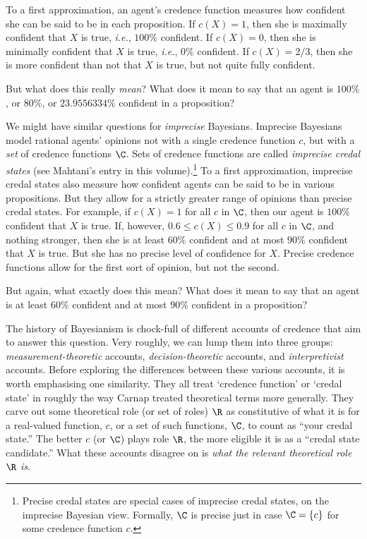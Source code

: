 To a first approximation, an agent's credence function measures how confident she can be said to be in each proposition. If $c(X)=1$, then she is maximally confident that $X$ is true, \textit{i.e.}, $100\%$ confident. If $c(X)=0$, then she is minimally confident that $X$ is true, \textit{i.e.}, $0\%$ confident. If $c(X)=2/3$, then she is more confident than not that $X$ is true, but not quite fully confident. 

But what does this really \textit{mean}? What does it mean to say that an agent is $100\%$, or $80\%$, or $23.9556334\%$ confident in a proposition?



We might have similar questions for \textit{imprecise} Bayesians. Imprecise Bayesians model rational agents' opinions not with a single credence function $c$, but with a \textit{set} of credence functions $\C$. Sets of credence functions are called \textit{imprecise credal states} (see Mahtani's entry in this volume).\footnote{Precise credal states are special cases of imprecise credal states, on the imprecise Bayesian view. Formally, $\C$ is precise just in case $\C=\left\{c\right\}$ for some credence function $c$.} To a first approximation, imprecise credal states also measure how confident agents can be said to be in various propositions. But they allow for a strictly greater range of opinions than precise credal states. For example, if $c(X)=1$ for all $c$ in $\C$, then our agent is $100\%$ confident that $X$ is true. If, however, $0.6\leq c(X)\leq0.9$ for all $c$ in $\C$, and nothing stronger, then she is at least $60\%$ confident and at most $90\%$ confident that $X$ is true. But she has no precise level of confidence for $X$. Precise credence functions allow for the first sort of opinion, but not the second.

But again, what exactly does this mean? What does it mean to say that an agent is at least $60\%$ confident and at most $90\%$ confident in a proposition?




The history of Bayesianism is chock-full of different accounts of credence that aim to answer this question. Very roughly, we can lump them into three groups: \textit{measurement-theoretic} accounts, \textit{decision-theoretic} accounts, and \textit{interpretivist} accounts. Before exploring the differences between these various accounts, it is worth emphasising one similarity. They all treat `credence function' or `credal state' in roughly the way Carnap treated theoretical terms more generally. They carve out some theoretical role (or set of roles) $\R$ as constitutive of what it is for a real-valued function, $c$, or a set of such functions, $\C$, to count as ``your credal state.'' The better $c$ (or $\C$) plays role $\R$, the more eligible it is as a ``credal state candidate.'' What these accounts disagree on is \textit{what the relevant theoretical role $\R$ is}.


